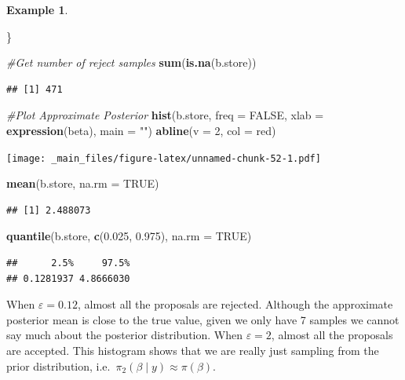 \documentclass[
]{book}
\newenvironment{Shaded}{\begin{snugshade}}{\end{snugshade}}
\newcommand{\AttributeTok}[1]{\textcolor[rgb]{0.13,0.29,0.53}{#1}}
\newcommand{\CommentTok}[1]{\textcolor[rgb]{0.56,0.35,0.01}{\textit{#1}}}
\newcommand{\ConstantTok}[1]{\textcolor[rgb]{0.56,0.35,0.01}{#1}}
\newcommand{\DecValTok}[1]{\textcolor[rgb]{0.00,0.00,0.81}{#1}}
\newcommand{\FloatTok}[1]{\textcolor[rgb]{0.00,0.00,0.81}{#1}}
\newcommand{\FunctionTok}[1]{\textcolor[rgb]{0.13,0.29,0.53}{\textbf{#1}}}
\newcommand{\NormalTok}[1]{#1}
\newcommand{\StringTok}[1]{\textcolor[rgb]{0.31,0.60,0.02}{#1}}
\theoremstyle{definition}
\theoremstyle{definition}
\newtheorem{example}{Example}[chapter]
\theoremstyle{definition}
\theoremstyle{definition}
\theoremstyle{remark}
\begin{document}
\begin{example}
\begin{Shaded}
\begin{Highlighting}[]
\NormalTok{\}}

\CommentTok{\#Get number of reject samples}
\FunctionTok{sum}\NormalTok{(}\FunctionTok{is.na}\NormalTok{(b.store))}
\end{Highlighting}
\end{Shaded}

\begin{verbatim}
## [1] 471
\end{verbatim}

\begin{Shaded}
\begin{Highlighting}[]
\CommentTok{\#Plot Approximate Posterior}
\FunctionTok{hist}\NormalTok{(b.store, }\AttributeTok{freq =} \ConstantTok{FALSE}\NormalTok{, }\AttributeTok{xlab =} \FunctionTok{expression}\NormalTok{(beta), }\AttributeTok{main =} \StringTok{""}\NormalTok{)}
\FunctionTok{abline}\NormalTok{(}\AttributeTok{v =} \DecValTok{2}\NormalTok{, }\AttributeTok{col =} \StringTok{\textquotesingle{}red\textquotesingle{}}\NormalTok{)}
\end{Highlighting}
\end{Shaded}

\texttt{[image: \_main\_files/figure-latex/unnamed-chunk-52-1.pdf]}

\begin{Shaded}
\begin{Highlighting}[]
\FunctionTok{mean}\NormalTok{(b.store, }\AttributeTok{na.rm =} \ConstantTok{TRUE}\NormalTok{)}
\end{Highlighting}
\end{Shaded}

\begin{verbatim}
## [1] 2.488073
\end{verbatim}

\begin{Shaded}
\begin{Highlighting}[]
\FunctionTok{quantile}\NormalTok{(b.store, }\FunctionTok{c}\NormalTok{(}\FloatTok{0.025}\NormalTok{, }\FloatTok{0.975}\NormalTok{), }\AttributeTok{na.rm =} \ConstantTok{TRUE}\NormalTok{)}
\end{Highlighting}
\end{Shaded}

\begin{verbatim}
##      2.5%     97.5% 
## 0.1281937 4.8666030
\end{verbatim}

When \(\varepsilon = 0.12\), almost all the proposals are rejected. Although the approximate posterior mean is close to the true value, given we only have 7 samples we cannot say much about the posterior distribution. When \(\varepsilon = 2\), almost all the proposals are accepted. This histogram shows that we are really just sampling from the prior distribution, i.e.~\(\pi_2(\beta \mid y) \approx \pi(\beta)\).
\end{example}
\end{document}
